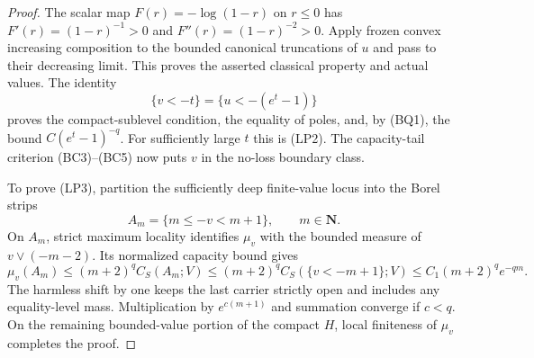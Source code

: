 \begin{proof}
The scalar map $F(r)=-\log(1-r)$ on $r\leq0$ has
$F'(r)=(1-r)^{-1}>0$ and $F''(r)=(1-r)^{-2}>0$.
Apply frozen convex increasing composition to the bounded
canonical truncations of $u$ and pass to their decreasing
limit. This proves the asserted classical property and actual
values. The identity
\[
                    \{v<-t\}=\{u<-(e^t-1)\}
 \tag{LP4}
\]
proves the compact-sublevel condition, the equality of poles,
and, by (BQ1), the bound $C(e^t-1)^{-q}$.
For sufficiently large $t$ this is (LP2).
The capacity-tail criterion (BC3)--(BC5) now puts $v$ in
the no-loss boundary class.

To prove (LP3), partition the sufficiently deep finite-value
locus into the Borel strips
\[
                     A_m=\{m\leq-v<m+1\},
                           \qquad m\in\mathbf N.
 \tag{LP5}
\]
On $A_m$, strict maximum locality identifies $\mu_v$ with
the bounded measure of $v\vee(-m-2)$. Its normalized capacity
bound gives
\[
 \mu_v(A_m)
    \leq(m+2)^q C_S(A_m;V)
    \leq(m+2)^q C_S(\{v<-m+1\};V)
    \leq C_1(m+2)^q e^{-qm}.
 \tag{LP6}
\]
The harmless shift by one keeps the last carrier strictly
open and includes any equality-level mass. Multiplication by
$e^{c(m+1)}$ and summation converge if $c<q$.
On the remaining bounded-value portion of the compact $H$,
local finiteness of $\mu_v$ completes the proof.
\end{proof}

